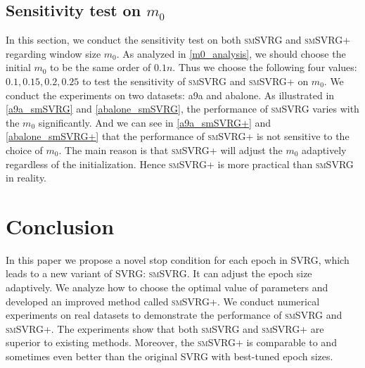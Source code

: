 \documentclass[conference]{IEEEtran}
\begin{document}
\subsection{Sensitivity test on $m_0$}
In this section, we conduct the sensitivity test on both \textsc{smSVRG} and \textsc{smSVRG+} regarding window size $m_0$. As analyzed in \ref{m0_analysis}, we should choose the initial $m_0$ to be the same order of $0.1n$. Thus we choose the following four values: $0.1, 0.15, 0.2, 0.25$ to test the sensitivity of \textsc{smSVRG} and \textsc{smSVRG+} on $m_0$. We conduct the experiments on two datasets: a9a and abalone. As illustrated in \ref{a9a_smSVRG} and \ref{abalone_smSVRG}, the performance of \textsc{smSVRG} varies with the $m_0$ significantly. And we can see in \ref{a9a_smSVRG+} and \ref{abalone_smSVRG+} that the performance of \textsc{smSVRG+} is not sensitive to the choice of $m_0$. The main reason is that \textsc{smSVRG+} will adjust the $m_0$ adaptively regardless of the initialization. 
Hence \textsc{smSVRG+} is more practical than \textsc{smSVRG} in reality.

\section{Conclusion}
In this paper we propose a novel stop condition for each epoch in SVRG, which leads to a new variant of SVRG: \textsc{smSVRG}. It can adjust the epoch size adaptively. We analyze how to choose the optimal value of parameters and developed an improved method called \textsc{smSVRG+}. We conduct numerical experiments on real datasets to demonstrate the performance of \textsc{smSVRG} and \textsc{smSVRG+}. The experiments show that both \textsc{smSVRG} and \textsc{smSVRG+} are superior to existing methods. Moreover, the \textsc{smSVRG+} is comparable to and sometimes even better than the original SVRG with best-tuned epoch sizes.
\label{conclusion}






\end{document}
